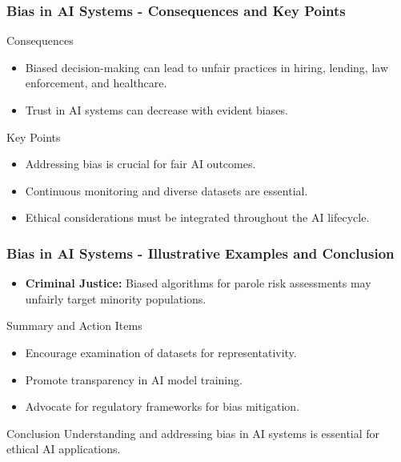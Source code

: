 \documentclass[aspectratio=169]{beamer}
\begin{document}
\begin{frame}[fragile]
    \frametitle{Bias in AI Systems - Consequences and Key Points}
    \begin{block}{Consequences}
        \begin{itemize}
            \item Biased decision-making can lead to unfair practices in hiring, lending, law enforcement, and healthcare.
            \item Trust in AI systems can decrease with evident biases.
        \end{itemize}
    \end{block}

    \begin{block}{Key Points}
        \begin{itemize}
            \item Addressing bias is crucial for fair AI outcomes.
            \item Continuous monitoring and diverse datasets are essential.
            \item Ethical considerations must be integrated throughout the AI lifecycle.
        \end{itemize}
    \end{block}
\end{frame}

\begin{frame}[fragile]
    \frametitle{Bias in AI Systems - Illustrative Examples and Conclusion}
    \begin{itemize}
        \item \textbf{Criminal Justice:} Biased algorithms for parole risk assessments may unfairly target minority populations.
    \end{itemize}

    \begin{block}{Summary and Action Items}
        \begin{itemize}
            \item Encourage examination of datasets for representativity.
            \item Promote transparency in AI model training.
            \item Advocate for regulatory frameworks for bias mitigation.
        \end{itemize}
    \end{block}

    \begin{block}{Conclusion}
        Understanding and addressing bias in AI systems is essential for ethical AI applications.
    \end{block}
\end{frame}
\end{document}
